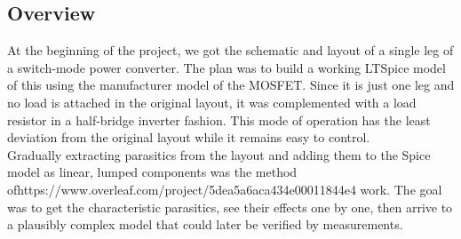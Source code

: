 \subsection{Overview}
\label{sec:overview}

At the beginning of the project, we got the schematic and layout of a single leg of a switch-mode power converter. The plan was to build a working LTSpice model of this using the manufacturer model of the MOSFET. Since it is just one leg and no load is attached in the original layout, it was complemented with a load resistor in a half-bridge inverter fashion. This mode of operation has the least deviation from the original layout while it remains easy to control. \\

Gradually extracting parasitics from the layout and adding them to the Spice model as linear, lumped components was the method ofhttps://www.overleaf.com/project/5dea5a6aca434e00011844e4 work. The goal was to get the characteristic parasitics, see their effects one by one, then arrive to a plausibly complex model that could later be verified by measurements.